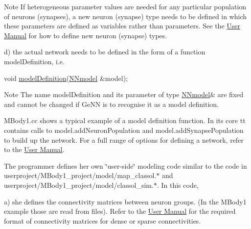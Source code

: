 \begin{DoxyEnumerate}
\begin{DoxyNote}{Note}
 If heterogeneous parameter values are needed for any particular population of neurons (synapses), a new neuron (synapse) type needs to be defined in which these parameters are defined as variables rather than parameters. See the \hyperlink{UserManual}{User Manual} for how to define new neuron (synapse) types.
\end{DoxyNote}
d) the actual network needs to be defined in the form of a function {\ttfamily model\+Definition}, i.\+e. 
\begin{DoxyCode}
\textcolor{keywordtype}{void} \hyperlink{tmp_2model_2MBody__userdef_8cc_a9aeaa0a22980484b2c472564fc9f686e}{modelDefinition}(\hyperlink{classNNmodel}{NNmodel} &model); 
\end{DoxyCode}
 \begin{DoxyNote}{Note}
The name {\ttfamily model\+Definition} and its parameter of type {\ttfamily \hyperlink{classNNmodel}{N\+Nmodel}\&} are fixed and cannot be changed if Ge\+N\+N is to recognise it as a model definition.
\end{DoxyNote}
{\ttfamily M\+Body1.\+cc} shows a typical example of a model definition function. In its core tt contains calls to {\ttfamily model.\+add\+Neuron\+Population} and {\ttfamily model.\+add\+Synapse\+Population} to build up the network. For a full range of options for defining a network, refer to the \hyperlink{UserManual}{User Manual}.
\item The programmer defines her own \char`\"{}user-\/side\char`\"{} modeling code similar to the code in {\ttfamily userproject/\+M\+Body1\+\_\+project/model/map\+\_\+classol.$\ast$} and {\ttfamily userproject/\+M\+Body1\+\_\+project/model/classol\+\_\+sim.$\ast$}. In this code,

a) she defines the connectivity matrices between neuron groups. (In the M\+Body1 example those are read from files). Refer to the \hyperlink{UserManual}{User Manual} for the required format of connectivity matrices for dense or sparse connectivities.


\end{DoxyEnumerate}
